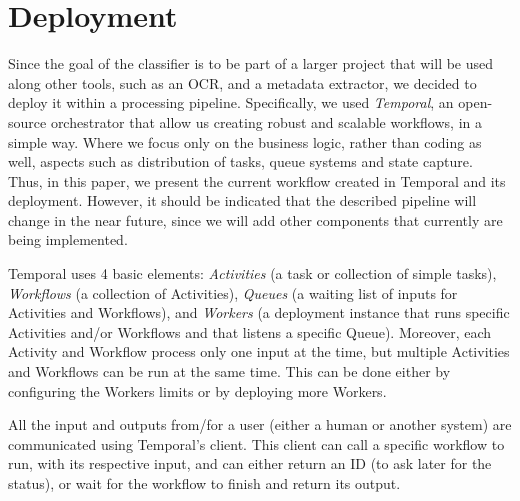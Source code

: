 \documentclass[11pt]{article}
\begin{document}


\section{Deployment}

    Since the goal of the classifier is to be part of a larger project that will be used along other tools, such as an OCR, and a metadata extractor, we decided to deploy it within a processing pipeline. Specifically, we used \textit{Temporal}, an open-source orchestrator that allow us creating robust and scalable workflows, in a simple way. Where we focus only on the business logic, rather than coding as well, aspects such as distribution of tasks, queue systems and state capture. Thus, in this paper, we present the current workflow created in Temporal and its deployment. However, it should be indicated that the described pipeline will change in the near future, since we will add other components that currently are being implemented.

    Temporal uses 4 basic elements: \textit{Activities} (a task or collection of simple tasks), \textit{Workflows} (a collection of Activities), \textit{Queues} (a waiting list of inputs for Activities and Workflows), and \textit{Workers} (a deployment instance that runs specific Activities and/or Workflows and that listens a specific Queue). Moreover, each Activity and Workflow process only one input at the time, but multiple Activities and Workflows can be run at the same time. This can be done either by configuring the Workers limits or by deploying more Workers.

    All the input and outputs from/for a user (either a human or another system) are communicated using Temporal's client. This client can call a specific workflow to run, with its respective input, and can either return an ID (to ask later for the status), or wait for the workflow to finish and return its output.
\end{document}
